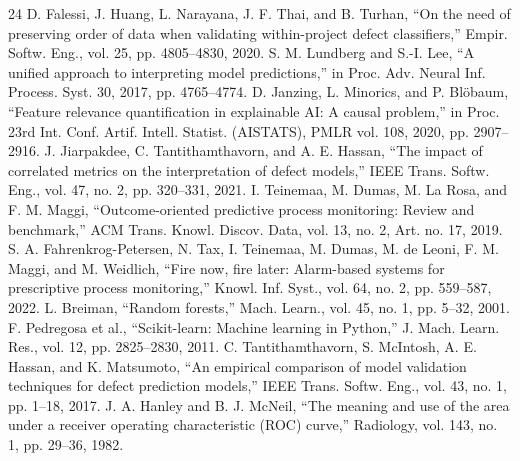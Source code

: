 \documentclass[conference]{IEEEtran}
\begin{document}
\begin{thebibliography}{24}
 D. Falessi, J. Huang, L. Narayana, J. F. Thai, and B. Turhan, ``On the need of preserving order of data when validating within-project defect classifiers,'' Empir. Softw. Eng., vol. 25, pp. 4805--4830, 2020.
 S. M. Lundberg and S.-I. Lee, ``A unified approach to interpreting model predictions,'' in Proc. Adv. Neural Inf. Process. Syst. 30, 2017, pp. 4765--4774.
 D. Janzing, L. Minorics, and P. Blöbaum, ``Feature relevance quantification in explainable AI: A causal problem,'' in Proc. 23rd Int. Conf. Artif. Intell. Statist. (AISTATS), PMLR vol. 108, 2020, pp. 2907--2916.
 J. Jiarpakdee, C. Tantithamthavorn, and A. E. Hassan, ``The impact of correlated metrics on the interpretation of defect models,'' IEEE Trans. Softw. Eng., vol. 47, no. 2, pp. 320--331, 2021.
 I. Teinemaa, M. Dumas, M. La Rosa, and F. M. Maggi, ``Outcome-oriented predictive process monitoring: Review and benchmark,'' ACM Trans. Knowl. Discov. Data, vol. 13, no. 2, Art. no. 17, 2019.
 S. A. Fahrenkrog-Petersen, N. Tax, I. Teinemaa, M. Dumas, M. de Leoni, F. M. Maggi, and M. Weidlich, ``Fire now, fire later: Alarm-based systems for prescriptive process monitoring,'' Knowl. Inf. Syst., vol. 64, no. 2, pp. 559--587, 2022.
 L. Breiman, ``Random forests,'' Mach. Learn., vol. 45, no. 1, pp. 5--32, 2001.
 F. Pedregosa et al., ``Scikit-learn: Machine learning in Python,'' J. Mach. Learn. Res., vol. 12, pp. 2825--2830, 2011.
 C. Tantithamthavorn, S. McIntosh, A. E. Hassan, and K. Matsumoto, ``An empirical comparison of model validation techniques for defect prediction models,'' IEEE Trans. Softw. Eng., vol. 43, no. 1, pp. 1--18, 2017.
 J. A. Hanley and B. J. McNeil, ``The meaning and use of the area under a receiver operating characteristic (ROC) curve,'' Radiology, vol. 143, no. 1, pp. 29--36, 1982.
\end{thebibliography}
\end{document}
